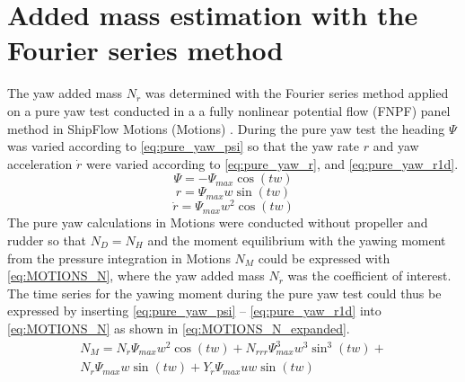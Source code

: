 \section{Added mass estimation with the Fourier series method}
\label{sec:fourier}
The yaw added mass $N_{\dot{r}}$ was determined with the Fourier series method \cite{sakamotoCFDBasedTurning2021} applied on a pure yaw test conducted in a a fully nonlinear potential flow (FNPF) panel method in ShipFlow Motions (Motions) \cite{kjellbergFullyNonlinearUnsteady2013}.
During the pure yaw test the heading $\Psi$ was varied according to \autoref{eq:pure_yaw_psi} so that the yaw rate $r$ and yaw acceleration $\dot{r}$ were varied according to \autoref{eq:pure_yaw_r}, and \autoref{eq:pure_yaw_r1d}.
\begin{equation}
    \Psi = - \Psi_{max} \cos{\left(t w \right)}
    \label{eq:pure_yaw_psi}
\end{equation}
\begin{equation}
    r = \Psi_{max} w \sin{\left(t w \right)}
    \label{eq:pure_yaw_r}
\end{equation}
\begin{equation}
    \dot{r} = \Psi_{max} w^{2} \cos{\left(t w \right)}
    \label{eq:pure_yaw_r1d}
\end{equation}
The pure yaw calculations in Motions were conducted without propeller and rudder so that $N_D=N_H$ and the moment equilibrium with the yawing moment from the pressure integration in Motions $N_M$ could be expressed with \autoref{eq:MOTIONS_N}, where the yaw added mass $N_{\dot{r}}$ was the coefficient of interest. 
\begin{equation}
    
    \label{eq:MOTIONS_N}
\end{equation}
The time series for the yawing moment during the pure yaw test could thus be expressed by inserting \autoref{eq:pure_yaw_psi} -- \autoref{eq:pure_yaw_r1d} into \autoref{eq:MOTIONS_N} as shown in \autoref{eq:MOTIONS_N_expanded}.
\begin{equation}
    \begin{aligned}    
    N_{M} = N_{\dot{r}} \Psi_{max} w^{2} \cos{\left(t w \right)} + N_{rrr} \Psi_{max}^{3} w^{3} \sin^{3}{\left(t w \right)} + \\ 
    N_{r} \Psi_{max} w \sin{\left(t w \right)} + Y_{\dot{r}} \Psi_{max} u w \sin{\left(t w \right)}
    \end{aligned}
    \label{eq:MOTIONS_N_expanded}
\end{equation}
